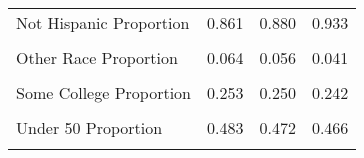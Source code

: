 \begin{table}[H]
\begin{tabular}[t]{lrrr}
Not Hispanic Proportion & 0.861 & 0.880 & 0.933\\
\cellcolor{gray!6}{Not Married Proportion} & \cellcolor{gray!6}{0.368} & \cellcolor{gray!6}{0.396} & \cellcolor{gray!6}{0.373}\\
Other Race Proportion & 0.064 & 0.056 & 0.041\\
\addlinespace
\cellcolor{gray!6}{Over 50 Proportion} & \cellcolor{gray!6}{0.337} & \cellcolor{gray!6}{0.348} & \cellcolor{gray!6}{0.360}\\
Some College Proportion & 0.253 & 0.250 & 0.242\\
\cellcolor{gray!6}{Under 30 Proportion} & \cellcolor{gray!6}{0.180} & \cellcolor{gray!6}{0.180} & \cellcolor{gray!6}{0.175}\\
Under 50 Proportion & 0.483 & 0.472 & 0.466\\
\cellcolor{gray!6}{White Proportion} & \cellcolor{gray!6}{0.870} & \cellcolor{gray!6}{0.837} & \cellcolor{gray!6}{0.813}\\
\bottomrule
\end{tabular}
\end{table}
